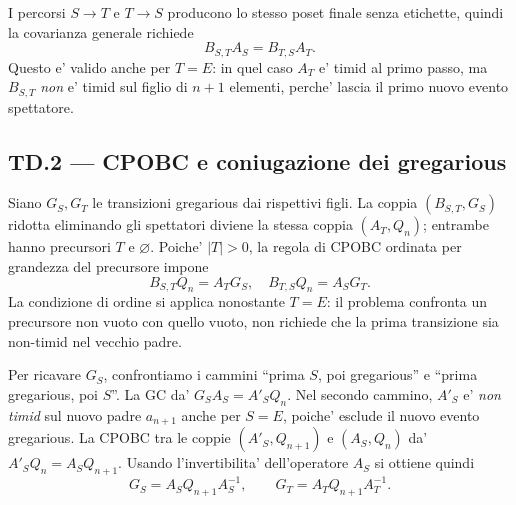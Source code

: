 \documentclass[11pt,a4paper]{article}
\begin{document}
I percorsi $S\to T$ e $T\to S$ producono lo stesso poset finale senza etichette, quindi la covarianza generale richiede
\begin{equation}
 B_{S,T}A_S=B_{T,S}A_T.\tag{TD.1}
\end{equation}
Questo e' valido anche per $T=E$: in quel caso $A_T$ e' timid al primo passo, ma $B_{S,T}$ \emph{non} e' timid sul figlio di $n+1$ elementi, perche' lascia il primo nuovo evento spettatore.

\subsection*{TD.2 --- CPOBC e coniugazione dei gregarious}
Siano $G_S,G_T$ le transizioni gregarious dai rispettivi figli. La coppia $(B_{S,T},G_S)$ ridotta eliminando gli spettatori diviene la stessa coppia $(A_T,Q_n)$; entrambe hanno precursori $T$ e $\varnothing$. Poiche' $|T|>0$, la regola di CPOBC ordinata per grandezza del precursore impone
\begin{equation}
 B_{S,T}Q_n=A_TG_S,\quad
 B_{T,S}Q_n=A_SG_T.\tag{TD.2}
\end{equation}
La condizione di ordine si applica nonostante $T=E$: il problema confronta un precursore non vuoto con quello vuoto, non richiede che la prima transizione sia non-timid nel vecchio padre.

Per ricavare $G_S$, confrontiamo i cammini ``prima $S$, poi gregarious'' e ``prima gregarious, poi $S$''. La GC da' $G_SA_S=A'_SQ_n$. Nel secondo cammino, $A'_S$ e' \emph{non timid} sul nuovo padre $a_{n+1}$ anche per $S=E$, poiche' esclude il nuovo evento gregarious. La CPOBC tra le coppie $(A'_S,Q_{n+1})$ e $(A_S,Q_n)$ da' $A'_SQ_n=A_SQ_{n+1}$. Usando l'invertibilita' dell'operatore $A_S$ si ottiene quindi
\begin{equation}
 G_S=A_SQ_{n+1}A_S^{-1},\qquad
 G_T=A_TQ_{n+1}A_T^{-1}.\tag{TD.3}
\end{equation}
\clearpage
\end{document}
